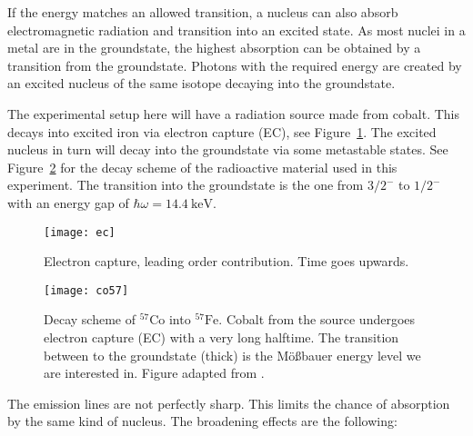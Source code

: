\documentclass[11pt, english, fleqn, DIV=15, headinclude, BCOR=2cm]{scrreprt}
\begin{document}
If the energy matches an allowed transition, a nucleus can also absorb
electromagnetic radiation and transition into an excited state. As most nuclei
in a metal are in the groundstate, the highest absorption can be obtained by a
transition from the groundstate. Photons with the required energy are created
by an excited nucleus of the same isotope decaying into the groundstate.

The experimental setup here will have a radiation source made from cobalt. This
decays into excited iron via electron capture (EC), see Figure~\ref{fig:ec}.
The excited nucleus in turn will decay into the groundstate via some
metastable states. See Figure~\ref{fig:co57} for the decay scheme of the
radioactive material used in this experiment. The transition into the
groundstate is the one from $3/2^-$ to $1/2^-$ with an energy gap of $\hbar
\omega = \SI{14.4}{\kilo\electronvolt}$.

\begin{figure}
    \centering
    \texttt{[image: ec]}
    \caption{%
        Electron capture, leading order contribution. Time goes upwards.
    }
    \label{fig:ec}
\end{figure}

\begin{figure}
    \centering
    \texttt{[image: co57]}
    \caption{%
        Decay scheme of $^{57}\mathrm{Co}$ into $^{57}\mathrm{Fe}$. Cobalt from
        the source undergoes electron capture (EC) with a very long halftime.
        The transition between to the groundstate (thick) is the Mößbauer
        energy level we are interested in.
        Figure adapted from
        \textcite[Fig.~4.8]{Schatz/Nukleare_Festkoerperphysik}.
    }
    \label{fig:co57}
\end{figure}

The emission lines are not perfectly sharp. This limits the chance of
absorption by the same kind of nucleus. The broadening effects are the
following:
\end{document}
